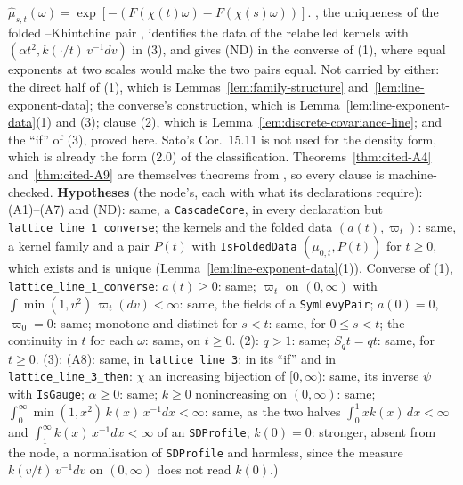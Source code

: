 \begin{theorem}
{$\widehat\mu_{s,t}(\omega) = \exp[-(F(\chi(t)\omega) - F(\chi(s)\omega))]$. , the
uniqueness of the folded \Levy{}--Khintchine pair ,
identifies the data of the relabelled kernels with $(\alpha t^2, k(\cdot/t)\,v^{-1}dv)$ in (3), and
gives (ND) in the converse of (1), where equal exponents at two scales would make the two pairs
equal. Not carried by either: the direct half of (1), which is
Lemmas~\ref{lem:family-structure} and~\ref{lem:line-exponent-data}; the converse's construction,
which is Lemma~\ref{lem:line-exponent-data}(1) and (3); clause (2), which is
Lemma~\ref{lem:discrete-covariance-line}; and the ``if'' of (3), proved here. Sato's Cor.~15.11 is
not used for the density form, which is already the form (2.0) of the classification.
Theorems~\ref{thm:cited-A4} and~\ref{thm:cited-A9} are themselves theorems from , so
every clause is machine-checked. \textbf{Hypotheses} (the node's, each with what its declarations
require): (A1)--(A7) and (ND): same, a \texttt{CascadeCore}, in every declaration but
\texttt{lattice\_line\_1\_converse}; the kernels and the folded data $(a(t), \varpi_t)$: same, a
kernel family and a pair $P(t)$ with \texttt{IsFoldedData} $(\mu_{0,t}, P(t))$ for $t \ge 0$,
which exists and is unique (Lemma~\ref{lem:line-exponent-data}(1)). Converse of (1),
\texttt{lattice\_line\_1\_converse}: $a(t) \ge 0$: same; $\varpi_t$ on $(0,\infty)$ with
$\int\min(1, v^2)\,\varpi_t(dv) < \infty$: same, the fields of a \texttt{SymLevyPair};
$a(0) = 0$, $\varpi_0 = 0$: same; monotone and distinct for $s < t$: same, for $0 \le s < t$; the
continuity in $t$ for each $\omega$: same, on $t \ge 0$. (2): $q > 1$: same; $S_qt = qt$: same,
for $t \ge 0$. (3): (A8): same, in \texttt{lattice\_line\_3}; in its ``if'' and in
\texttt{lattice\_line\_3\_then}: $\chi$ an increasing bijection of $[0,\infty)$: same, its inverse
$\psi$ with \texttt{IsGauge}; $\alpha \ge 0$: same; $k \ge 0$ nonincreasing on $(0,\infty)$:
same; $\int_0^\infty\min(1, x^2)\,k(x)\,x^{-1}dx < \infty$: same, as the two halves
$\int_0^1xk(x)\,dx < \infty$ and $\int_1^\infty k(x)\,x^{-1}dx < \infty$ of an \texttt{SDProfile};
$k(0) = 0$: stronger, absent from the node, a normalisation of \texttt{SDProfile} and harmless,
since the measure $k(v/t)\,v^{-1}dv$ on $(0,\infty)$ does not read $k(0)$.)}
\end{theorem}

